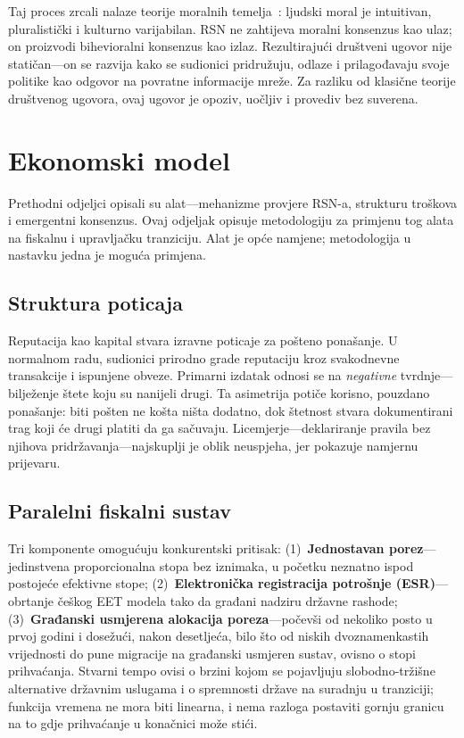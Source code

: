 \documentclass[11pt,a4paper,twocolumn]{article}
\begin{document}
Taj proces zrcali nalaze teorije moralnih temelja~\cite{haidt2012}: ljudski moral je intuitivan, pluralistički i kulturno varijabilan. RSN ne zahtijeva moralni konsenzus kao ulaz; on proizvodi bihevioralni konsenzus kao izlaz. Rezultirajući društveni ugovor nije statičan---on se razvija kako se sudionici pridružuju, odlaze i prilagođavaju svoje politike kao odgovor na povratne informacije mreže. Za razliku od klasične teorije društvenog ugovora, ovaj ugovor je opoziv, uočljiv i provediv bez suverena.

\section{Ekonomski model}

Prethodni odjeljci opisali su alat---mehanizme provjere RSN-a, strukturu troškova i emergentni konsenzus. Ovaj odjeljak opisuje metodologiju za primjenu tog alata na fiskalnu i upravljačku tranziciju. Alat je opće namjene; metodologija u nastavku jedna je moguća primjena.

\subsection{Struktura poticaja}

Reputacija kao kapital stvara izravne poticaje za pošteno ponašanje. U normalnom radu, sudionici prirodno grade reputaciju kroz svakodnevne transakcije i ispunjene obveze. Primarni izdatak odnosi se na \emph{negativne} tvrdnje---bilježenje štete koju su nanijeli drugi. Ta asimetrija potiče korisno, pouzdano ponašanje: biti pošten ne košta ništa dodatno, dok štetnost stvara dokumentirani trag koji će drugi platiti da ga sačuvaju. Licemjerje---deklariranje pravila bez njihova pridržavanja---najskuplji je oblik neuspjeha, jer pokazuje namjernu prijevaru.

\subsection{Paralelni fiskalni sustav}

Tri komponente omogućuju konkurentski pritisak: (1)~\textbf{Jednostavan porez}---jedinstvena proporcionalna stopa bez iznimaka, u početku neznatno ispod postojeće efektivne stope; (2)~\textbf{Elektronička registracija potrošnje (ESR)}---obrtanje češkog EET modela tako da građani nadziru državne rashode; (3)~\textbf{Građanski usmjerena alokacija poreza}---počevši od nekoliko posto u prvoj godini i dosežući, nakon desetljeća, bilo što od niskih dvoznamenkastih vrijednosti do pune migracije na građanski usmjeren sustav, ovisno o stopi prihvaćanja. Stvarni tempo ovisi o brzini kojom se pojavljuju slobodno-tržišne alternative državnim uslugama i o spremnosti države na suradnju u tranziciji; funkcija vremena ne mora biti linearna, i nema razloga postaviti gornju granicu na to gdje prihvaćanje u konačnici može stići.
\end{document}

